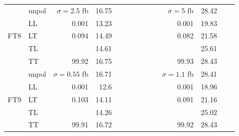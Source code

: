 \begin{table}[h]
{\begin{tabular}{llrrrrrrrrrrrr}
\midrule
\multirow{5}{*}{FT8}
 & unpol & $\sigma = \num{2.5}$ fb & \num{16.75} &  &  &  &  &  &  & $\sigma = \num{5}$ fb & \num{28.42} &  &  \\
 & LL & \num{0.001} & \num{13.23} &  &  &  &  &  &  & \num{0.001} & \num{19.83} &  &  \\
 & LT & \num{0.094} & \num{14.49} &  &  &  &  &  &  & \num{0.082} & \num{21.58} &  &  \\
 & TL &  & \num{14.61} &  &  &  &  &  &  &  & \num{25.61} &  &  \\
 & TT & \num{99.92} & \num{16.75} &  &  &  &  &  &  & \num{99.93} & \num{28.43} &  &  \\
\midrule
\multirow{5}{*}{FT9}
 & unpol & $\sigma = \num{0.55}$ fb & \num{16.71} &  &  &  &  &  &  & $\sigma = \num{1.1}$ fb & \num{28.41} &  &  \\
 & LL & \num{0.001} & \num{12.6} &  &  &  &  &  &  & \num{0.001} & \num{18.96} &  &  \\
 & LT & \num{0.103} & \num{14.11} &  &  &  &  &  &  & \num{0.091} & \num{21.16} &  &  \\
 & TL &  & \num{14.26} &  &  &  &  &  &  &  & \num{25.02} &  &  \\
 & TT & \num{99.91} & \num{16.72} &  &  &  &  &  &  & \num{99.92} & \num{28.43} &  &  \\
\bottomrule
\end{tabular}
}%
\end{table}